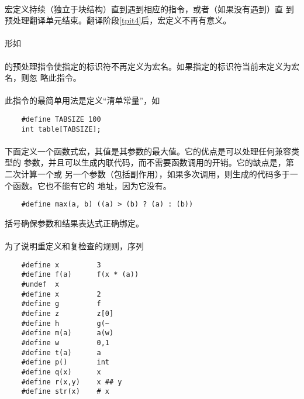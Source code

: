 {                                   
\paragraph{}
宏定义持续（独立于块结构）直到遇到相应的指令，或者（如果没有遇到）直
到预处理翻译单元结束。翻译阶段\ref{tpit4}后，宏定义不再有意义。

\paragraph{}
形如                                                                          \\
\mbox{\hspace{4em} }                     \\
的预处理指令使指定的标识符不再定义为宏名。如果指定的标识符当前未定义为宏名，则忽
略此指令。

\paragraph{}
\ex 此指令的最简单用法是定义``清单常量''，如
\begin{lstlisting}
    #define TABSIZE 100
    int table[TABSIZE];
\end{lstlisting}

\paragraph{}
\ex 下面定义一个函数式宏，其值是其参数的最大值。它的优点是可以处理任何兼容类型的
参数，并且可以生成内联代码，而不需要函数调用的开销。它的缺点是，第二次计算一个或
另一个参数（包括副作用），如果多次调用，则生成的代码多于一个函数。它也不能有它的
地址，因为它没有。
\begin{lstlisting}
    #define max(a, b) ((a) > (b) ? (a) : (b))
\end{lstlisting}
括号确保参数和结果表达式正确绑定。

\paragraph{}
\ex 为了说明重定义和复检查的规则，序列
\begin{lstlisting}
    #define x         3
    #define f(a)      f(x * (a))
    #undef  x
    #define x         2
    #define g         f
    #define z         z[0]
    #define h         g(~
    #define m(a)      a(w)
    #define w         0,1
    #define t(a)      a
    #define p()       int
    #define q(x)      x
    #define r(x,y)    x ## y
    #define str(x)    # x


\end{lstlisting}}
